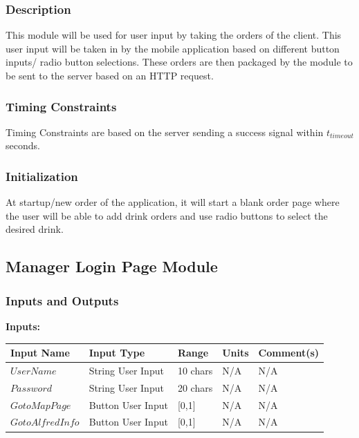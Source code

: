 \documentclass [10pt]{article}
\begin{document}
\subsubsection{Description}
This module will be used for user input by taking the orders of the client. This user input will be taken in by the mobile application based on different button inputs/ radio button selections. These orders are then packaged by the module to be sent to the server based on an HTTP request.


\subsubsection{Timing Constraints}
Timing Constraints are based on the server sending a success signal within $ t_{timeout} $ seconds.


\subsubsection{Initialization}
At startup/new order of the application, it will start a blank order page where the user will be able to add drink orders and use radio buttons to select the desired drink.


\subsection{Manager Login Page Module}


\subsubsection{Inputs and Outputs}

\textbf{Inputs: } \newline

\begin{longtable}{|l|l|l|l|l|}\hline 
	\rowcolor{tableCell}\textbf{Input Name} & \textbf{Input Type} & \textbf{Range} & \textbf{Units} & \textbf{Comment(s)} \\ \hline
	$  UserName $ & String User Input & 10 chars & N/A & N/A\\ \hline
	\rowcolor{tableCell}$  Password $ & String User Input & 20 chars  & N/A & N/A\\ \hline
	$  GotoMapPage $ & Button User Input & [0,1]  & N/A & N/A\\ \hline
	\rowcolor{tableCell}$  GotoAlfredInfo $ & Button User Input & [0,1]  & N/A & N/A\\ \hline
\end{longtable}
\end{document}
